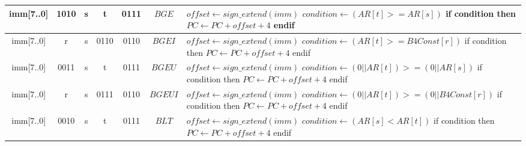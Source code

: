 \begin{longtable}{llllllllllllllllllllllll  p{1cm}  p{7cm} | }
		\multicolumn{8}{|c|}{imm[7..0]} & \multicolumn{4}{c|}{1010} & \multicolumn{4}{c|}{s} & \multicolumn{4}{c|}{t} & \multicolumn{4}{c|}{0111} & \multicolumn{1}{c|}{$BGE$} & $offset \leftarrow sign\_extend(imm)$ \newline $condition \leftarrow (AR[t] >= AR[s])$ \newline if condition then \newline $PC \leftarrow PC + offset + 4$ \newline endif\\ \hline
		\multicolumn{8}{|c|}{imm[7..0]} & \multicolumn{4}{c|}{r} & \multicolumn{4}{c|}{s} & \multicolumn{4}{c|}{0110} & \multicolumn{4}{c|}{0110} & \multicolumn{1}{c|}{$BGEI$} & $offset \leftarrow sign\_extend(imm)$ \newline $condition \leftarrow (AR[t] >= B4Const[r])$ \newline if condition then \newline $PC \leftarrow PC + offset + 4$ \newline endif\\ \hline
		\multicolumn{8}{|c|}{imm[7..0]} & \multicolumn{4}{c|}{0011} & \multicolumn{4}{c|}{s} & \multicolumn{4}{c|}{t} & \multicolumn{4}{c|}{0111} & \multicolumn{1}{c|}{$BGEU$} & $offset \leftarrow sign\_extend(imm)$ \newline $condition \leftarrow (0||AR[t]) >= (0||AR[s])$ \newline if condition then \newline $PC \leftarrow PC + offset + 4$ \newline endif\\ \hline
        \multicolumn{8}{|c|}{imm[7..0]} & \multicolumn{4}{c|}{r} & \multicolumn{4}{c|}{s} & \multicolumn{4}{c|}{0111} & \multicolumn{4}{c|}{0110} & \multicolumn{1}{c|}{$BGEUI$} & $offset \leftarrow sign\_extend(imm)$ \newline $condition \leftarrow (0||AR[t]) >= (0||B4Const[r])$ \newline if condition then \newline $PC \leftarrow PC + offset + 4$ \newline endif\\ \hline
		\multicolumn{8}{|c|}{imm[7..0]} & \multicolumn{4}{c|}{0010} & \multicolumn{4}{c|}{s} & \multicolumn{4}{c|}{t} & \multicolumn{4}{c|}{0111} & \multicolumn{1}{c|}{$BLT$} & $offset \leftarrow sign\_extend(imm)$ \newline $condition \leftarrow (AR[s] < AR[t])$ \newline if condition then \newline $PC \leftarrow PC + offset + 4$ \newline endif\\ \hline

\end{longtable}
